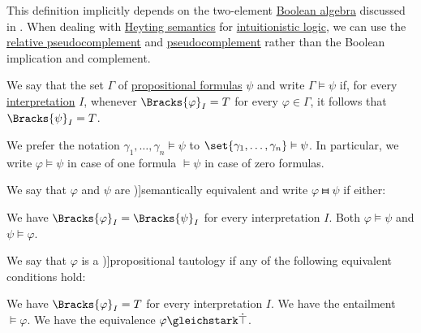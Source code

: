 \begin{comments}
  \item This definition implicitly depends on the two-element \hyperref[def:boolean_algebra]{Boolean algebra} discussed in . When dealing with \hyperref[def:propositional_heyting_algebra_semantics]{Heyting semantics} for \hyperref[def:intuitionistic_logic]{intuitionistic logic}, we can use the \hyperref[def:heyting_algebra]{relative pseudocomplement} and \hyperref[def:heyting_algebra/pseudocomplement]{pseudocomplement} rather than the Boolean implication and complement.
\end{comments}

\begin{definition}\label{def:propositional_entailment}
  We say that the set \( \Gamma \) of \hyperref[def:propositional_grammar_schema/formula]{propositional formulas}  \( \psi \) and write \( \Gamma \vDash \psi \) if, for every \hyperref[def:propositional_valuation/interpretation]{interpretation} \( I \), whenever \( \Bracks{\varphi}_I = T \) for every \( \varphi \in \Gamma \), it follows that \( \Bracks{\psi}_I = T \).

  We prefer the notation \( \gamma_1, \ldots, \gamma_n \vDash \psi \) to \( \set{ \gamma_1, \ldots, \gamma_n } \vDash \psi \). In particular, we write \( \varphi \vDash \psi \) in case of one formula \( \vDash \psi \) in case of zero formulas.

  \begin{thmenum}
     We say that \( \varphi \) and \( \psi \) are \term[ru=равносильные / эквивалентные (формулы) (\cite[44]{КолмогоровДрагалин2006})]{semantically equivalent} and write \( \varphi \gleichstark \psi \) if either:
    \begin{thmenum}
       We have \( \Bracks{\varphi}_I = \Bracks{\psi}_I \) for every interpretation \( I \).
       Both \( \varphi \vDash \psi \) and \( \psi \vDash \varphi \).
    \end{thmenum}

     We say that \( \varphi \) is a \term[ru=пропозициональная тавтология (\cite[44]{КолмогоровДрагалин2006})]{propositional tautology} if any of the following equivalent conditions hold:
    \begin{thmenum}
       We have \( \Bracks{\varphi}_I = T \) for every interpretation \( I \).
       We have the entailment \( \vDash \varphi \).
       We have the equivalence \( \varphi \gleichstark \syntop \).
    \end{thmenum}


\end{thmenum}
\end{definition}
